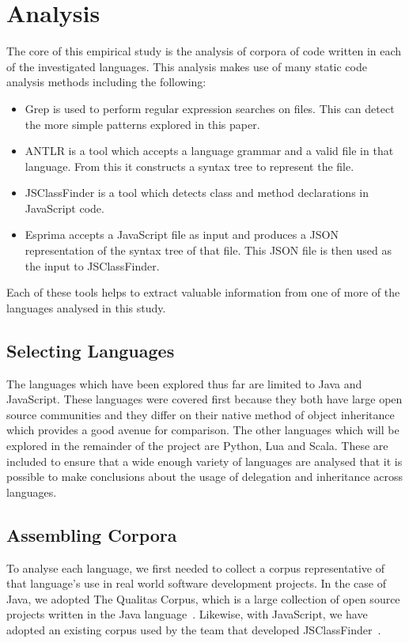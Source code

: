 \chapter{Analysis}\label{C:analysis} 
The core of this empirical study is the analysis of corpora of code written in each of the investigated languages. This analysis makes use of many static code analysis methods including the following:
\begin{itemize}
	\item Grep is used to perform regular expression searches on files. This can detect the more simple patterns explored in this paper.
	\item ANTLR is a tool which accepts a language grammar and a valid file in that language. From this it constructs a syntax tree to represent the file.
	\item JSClassFinder is a tool which detects class and method declarations in JavaScript code.
	\item Esprima accepts a JavaScript file as input and produces a JSON representation of the syntax tree of that file. This JSON file is then used as the input to JSClassFinder.
\end{itemize}
Each of these tools helps to extract valuable information from one of more of the languages analysed in this study.

\section{Selecting Languages}
The languages which have been explored thus far are limited to Java and JavaScript. These languages were covered first because they both have large open source communities and they differ on their native method of object inheritance which provides a good avenue for comparison. The other languages which will be explored in the remainder of the project are Python, Lua and Scala. These are included to ensure that a wide enough variety of languages are analysed that it is possible to make conclusions about the usage of delegation and inheritance across languages.

\section{Assembling Corpora}
To analyse each language, we first needed to collect a corpus representative of that language's use in real world software development projects. In the case of Java, we adopted The Qualitas Corpus, which is a large collection of open source projects written in the Java language~\cite{QualitasCorpus}. Likewise, with JavaScript, we have adopted an existing corpus used by the team that developed JSClassFinder~\cite{JSClassFinder}.
\newline

